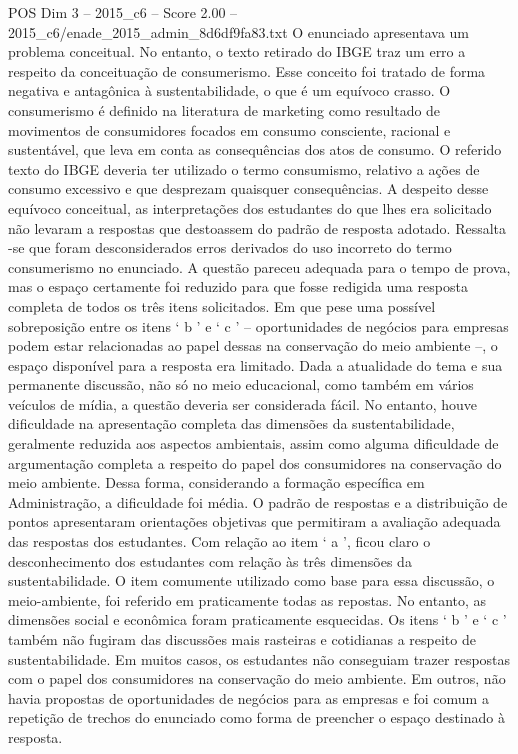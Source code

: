 \begin{textsample}{POS Dim 3 – 2015\_c6 – Score 2.00 – 2015\_c6/enade\_2015\_admin\_8d6df9fa83.txt}
O enunciado apresentava um problema conceitual.
No entanto, o texto retirado do IBGE traz um erro a respeito da conceituação de consumerismo.
Esse conceito foi tratado de forma negativa e antagônica à sustentabilidade, o que é um equívoco crasso.
O consumerismo é definido na literatura de marketing como resultado de movimentos de consumidores focados em consumo consciente, racional e sustentável, que leva em conta as consequências dos atos de consumo.
O referido texto do IBGE deveria ter utilizado o termo consumismo, relativo a ações de consumo excessivo e que desprezam quaisquer consequências.
A despeito desse equívoco conceitual, as interpretações dos estudantes do que lhes era solicitado não levaram a respostas que destoassem do padrão de resposta adotado.
Ressalta -se que foram desconsiderados erros derivados do uso incorreto do termo consumerismo no enunciado.
A questão pareceu adequada para o tempo de prova, mas o espaço certamente foi reduzido para que fosse redigida uma resposta completa de todos os três itens solicitados.
Em que pese uma possível sobreposição entre os itens ‘ b ’ e ‘ c ’ – oportunidades de negócios para empresas podem estar relacionadas ao papel dessas na conservação do meio ambiente –, o espaço disponível para a resposta era limitado.
Dada a atualidade do tema e sua permanente discussão, não só no meio educacional, como também em vários veículos de mídia, a questão deveria ser considerada fácil.
No entanto, houve dificuldade na apresentação completa das dimensões da sustentabilidade, geralmente reduzida aos aspectos ambientais, assim como alguma dificuldade de argumentação completa a respeito do papel dos consumidores na conservação do meio ambiente.
Dessa forma, considerando a formação específica em Administração, a dificuldade foi média.
O padrão de respostas e a distribuição de pontos apresentaram orientações objetivas que permitiram a avaliação adequada das respostas dos estudantes.
Com relação ao item ‘ a ’, ficou claro o desconhecimento dos estudantes com relação às três dimensões da sustentabilidade.
O item comumente utilizado como base para essa discussão, o meio-ambiente, foi referido em praticamente todas as repostas.
No entanto, as dimensões social e econômica foram praticamente esquecidas.
Os itens ‘ b ’ e ‘ c ’ também não fugiram das discussões mais rasteiras e cotidianas a respeito de sustentabilidade.
Em muitos casos, os estudantes não conseguiam trazer respostas com o papel dos consumidores na conservação do meio ambiente.
Em outros, não havia propostas de oportunidades de negócios para as empresas e foi comum a repetição de trechos do enunciado como forma de preencher o espaço destinado à resposta.

\end{textsample}
